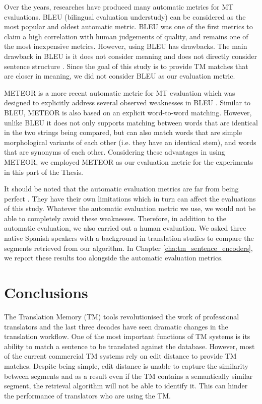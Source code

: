 Over the years, researches have produced many automatic metrics for MT evaluations. BLEU (bilingual evaluation understudy) \autocite{papineni-etal-2002-bleu} can be considered as the most popular and oldest automatic metric. BLEU was one of the first metrics to claim a high correlation with human judgements of quality, and remains one of the most inexpensive metrics. However, using BLEU has drawbacks. The main drawback in BLEU is it does not consider meaning and does not directly consider sentence structure \autocite{sellam-etal-2020-bleurt}. Since the goal of this study is to provide TM matches that are closer in meaning, we did not consider BLEU as our evaluation metric. 

METEOR is a more recent automatic metric for MT evaluation which was designed to explicitly address several observed weaknesses in BLEU \autocite{banerjee-lavie-2005-meteor}. Similar to BLEU, METEOR is also based on an explicit word-to-word matching. However, unlike BLEU it does not only supports matching between words that are identical in the two strings being compared, but can also match words that are simple morphological variants of each other (i.e. they have an identical stem), and words that are synonyms of each other. Considering these advantages in using METEOR, we employed METEOR as our evaluation metric for the experiments in this part of the Thesis. 

It should be noted that the automatic evaluation metrics are far from being perfect \autocite{sellam-etal-2020-bleurt}. They have their own limitations which in turn can affect the evaluations of this study. Whatever the automatic evaluation metric we use, we would not be able to completely avoid these weaknesses. Therefore, in addition to the automatic evaluation, we also carried out a human evaluation. We asked three native Spanish speakers with a background in translation studies to compare the segments retrieved from our algorithm. In Chapter \ref{cha:tm_sentence_encoders}, we report these results too alongside the automatic evaluation metrics.

\section{Conclusions}
The Translation Memory (TM) tools revolutionised the work of professional translators and the last three decades have seen dramatic changes in the translation workflow. One of the most important functions of TM systems is its ability to match a sentence to be translated against the database. However, most of the current commercial TM systems rely on edit distance to provide TM matches. Despite being simple, edit distance is unable to capture the similarity between segments and as a result even if the TM contains a semantically similar segment, the retrieval algorithm will not be able to identify it. This can hinder the performance of translators who are using the TM. 

